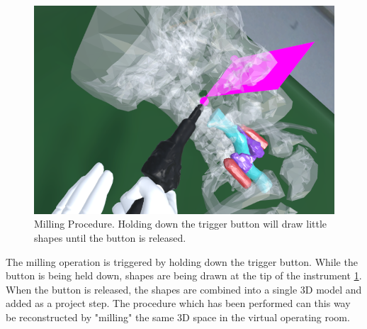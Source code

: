 \begin{figure}[ht!]
    \centering
    \includegraphics[width=\linewidth]{images/implementation/features/procedures/bonesaw.png}
    \caption{\label{fig::FeaturePiezo}Milling Procedure. Holding down the trigger button will draw little shapes until the button is released.}
\end{figure}

The milling operation is triggered by holding down the trigger button.
While the button is being held down, shapes are being drawn at the tip of the instrument \ref{fig::FeaturePiezo}.
When the button is released, the shapes are combined into a single 3D model and added as a project step.
The procedure which has been performed can this way be reconstructed by "milling" the same 3D space in the virtual operating room.